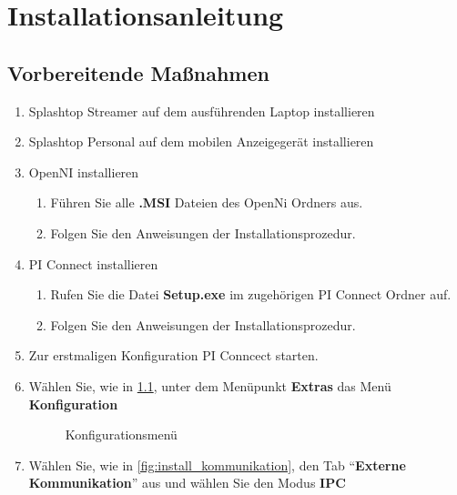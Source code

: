 
\chapter{Installationsanleitung}
\label{chap:install}

\section{Vorbereitende Maßnahmen}
\begin{enumerate}
	\item Splashtop Streamer auf dem ausführenden Laptop installieren
	\item Splashtop Personal auf dem mobilen Anzeigegerät installieren
	\item OpenNI installieren
	\begin{enumerate}
		\item Führen Sie alle \textbf{.MSI} Dateien des OpenNi Ordners aus.
		\item Folgen Sie den Anweisungen der Installationsprozedur.
	\end{enumerate}
	\item PI Connect installieren 
	\begin{enumerate}
		\item Rufen Sie die Datei \textbf{Setup.exe} im zugehörigen PI Connect Ordner auf.
		\item Folgen Sie den Anweisungen der Installationsprozedur.
	\end{enumerate}
	\item Zur erstmaligen Konfiguration PI Conncect starten.
	\item Wählen Sie, wie in \cref{fig:install_config}, unter dem Menüpunkt \textbf{Extras} das Menü \textbf{Konfiguration}
	\begin{figure}[t]
		\centering
		\caption{Konfigurationsmenü}
		\label{fig:install_config}
	\end{figure}
	\item Wählen Sie, wie in \cref{fig:install_kommunikation}, den Tab \enquote{\textbf{Externe Kommunikation}} aus und wählen Sie den Modus \textbf{IPC}
	\begin{figure}[t]
		\centering

\end{figure}
\end{enumerate}
